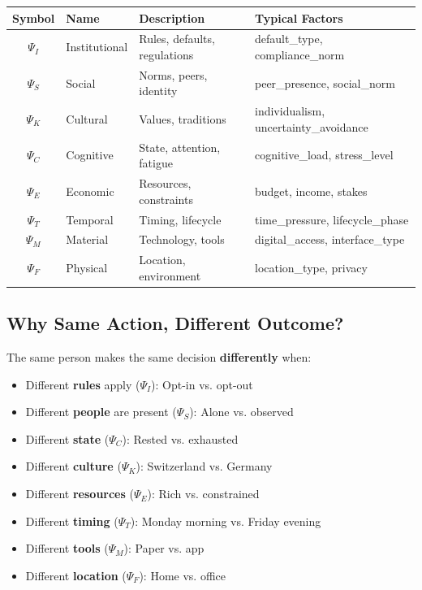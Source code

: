 \begin{center}
\begin{tabular}{clll}
\toprule
\textbf{Symbol} & \textbf{Name} & \textbf{Description} & \textbf{Typical Factors} \\
\midrule
$\Psi_I$ & Institutional & Rules, defaults, regulations & default\_type, compliance\_norm \\
$\Psi_S$ & Social & Norms, peers, identity & peer\_presence, social\_norm \\
$\Psi_K$ & Cultural & Values, traditions & individualism, uncertainty\_avoidance \\
$\Psi_C$ & Cognitive & State, attention, fatigue & cognitive\_load, stress\_level \\
$\Psi_E$ & Economic & Resources, constraints & budget, income, stakes \\
$\Psi_T$ & Temporal & Timing, lifecycle & time\_pressure, lifecycle\_phase \\
$\Psi_M$ & Material & Technology, tools & digital\_access, interface\_type \\
$\Psi_F$ & Physical & Location, environment & location\_type, privacy \\
\bottomrule
\end{tabular}
\end{center}

\subsection{Why Same Action, Different Outcome?}

The same person makes the same decision \textbf{differently} when:
\begin{itemize}
    \item Different \textbf{rules} apply ($\Psi_I$): Opt-in vs. opt-out
    \item Different \textbf{people} are present ($\Psi_S$): Alone vs. observed
    \item Different \textbf{state} ($\Psi_C$): Rested vs. exhausted
    \item Different \textbf{culture} ($\Psi_K$): Switzerland vs. Germany
    \item Different \textbf{resources} ($\Psi_E$): Rich vs. constrained
    \item Different \textbf{timing} ($\Psi_T$): Monday morning vs. Friday evening
    \item Different \textbf{tools} ($\Psi_M$): Paper vs. app
    \item Different \textbf{location} ($\Psi_F$): Home vs. office
\end{itemize}

